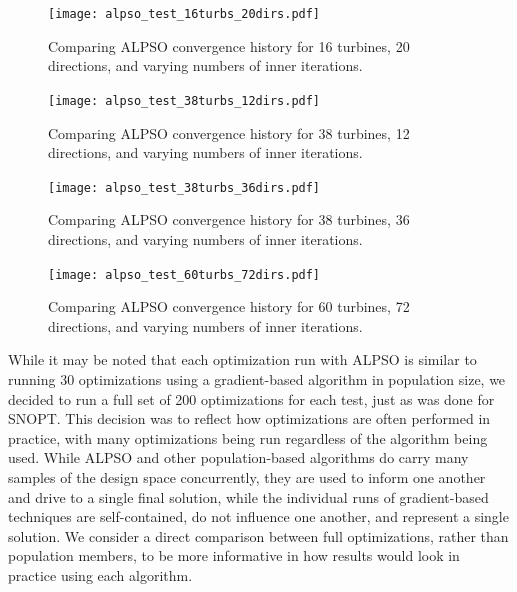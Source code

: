 \documentclass[a4paper]{jpconf}
\begin{document}
\begin{figure}[htp]
	\centering
	\begin{minipage}[t]{0.48\textwidth}
		\centering
		\texttt{[image: alpso\_test\_16turbs\_20dirs.pdf]}
		\caption{Comparing ALPSO convergence history for 16 turbines, 20 directions, and varying numbers of inner iterations.}
		\label{fig:alpso-ii-16-20}
	\end{minipage}\hspace{1pc}%
	\begin{minipage}[t]{0.48\textwidth}
		\centering
		\texttt{[image: alpso\_test\_38turbs\_12dirs.pdf]}
		\caption{Comparing ALPSO convergence history for 38 turbines, 12 directions, and varying numbers of inner iterations.}
		\label{fig:alpso-ii-38-12}
	\end{minipage} 
\end{figure}
\begin{figure}[htp]
	\centering
	\begin{minipage}[t]{0.48\textwidth}
		\centering
		\texttt{[image: alpso\_test\_38turbs\_36dirs.pdf]}
		\caption{Comparing ALPSO convergence history for 38 turbines, 36 directions, and varying numbers of inner iterations.}
		\label{fig:alpso-ii-38-36}
	\end{minipage}\hspace{1pc}%
	\begin{minipage}[t]{0.48\textwidth}
		\centering
		\texttt{[image: alpso\_test\_60turbs\_72dirs.pdf]}
		\caption{Comparing ALPSO convergence history for 60 turbines, 72 directions, and varying numbers of inner iterations.}
		\label{fig:alpso-ii-60-72}
	\end{minipage} 
\end{figure}

While it may be noted that each optimization run with ALPSO is similar to running 30 optimizations using a gradient-based algorithm in population size, we decided to run a full set of 200 optimizations for each test, just as was done for SNOPT. This decision was to reflect how optimizations are often performed in practice, with many optimizations being run regardless of the algorithm being used. While ALPSO and other population-based algorithms do carry many samples of the design space concurrently, they are used to inform one another and drive to a single final solution, while the individual runs of gradient-based techniques are self-contained, do not influence one another, and represent a single solution. We consider a direct comparison between full optimizations, rather than population members, to be more informative in how results would look in practice using each algorithm.
\end{document}
